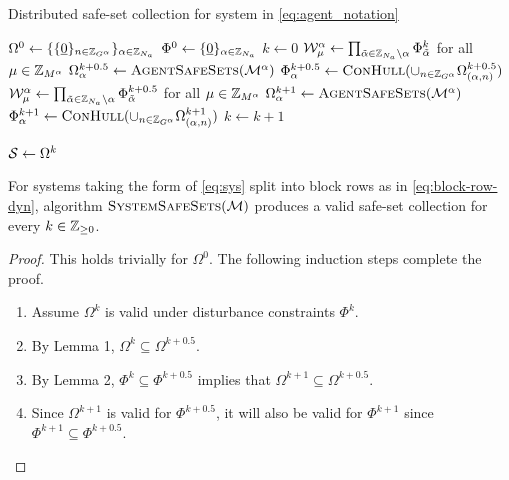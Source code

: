 \begin{algorithm}[t]
\caption{Distributed safe-set collection for system in \autoref{eq:agent_notation}}\label{alg:safe_sets}
\begin{algorithmic}[1]
\State $\Omega^0\gets\{\{\underline{0}\}_{n\in\idxset{\gnumnodes[\agentidx]}}\}_{\agentidx\in\idxset{\numagents}}$
\State $\Phi^0\gets\{\underline{0}\}_{\alpha\in\mathbb{Z}_{{N_a}}}$
\State $k\gets0$
\Repeat
		\State $\wcon[\modeidx]^\agentidx\gets\prod_{\tilde{\agentidx}\in\idxset{\numagents}\setminus \agentidx}\Phi^{k}_{\tilde\agentidx}$ for all $\modeidx\in\idxset{\nummodes[\agentidx]}$
		\State $\Omega^{k+0.5}_{\agentidx}\gets\Call{AgentSafeSets}{\modes[\agentidx]}$
		\State $\Phi^{k+0.5}_{\agentidx}\gets\Call{ConHull}{\cup_{n\in\idxset{\gnumnodes[{\agentidx}]}}\Omega^{k+0.5}_{({\agentidx},n)}}$
	\EndParFor
		\State $\wcon[\modeidx]^\agentidx\gets\prod_{\tilde{\agentidx}\in\idxset{\numagents}\setminus \agentidx}\Phi^{k+0.5}_{\tilde\agentidx}$ for all $\modeidx\in\idxset{\nummodes[\agentidx]}$
		\State $\Omega^{k+1}_{\agentidx}\gets\Call{AgentSafeSets}{\modes[\agentidx]}$
		\State $\Phi^{k+1}_{\agentidx}\gets\Call{ConHull}{\cup_{n\in\idxset{\gnumnodes[{\agentidx}]}}\Omega^{k+1}_{({\agentidx},n)}}$
	\EndParFor
	\State $k\gets k+1$

\State $\mathcal{S}\gets\Omega^k$
\EndProcedure
\end{algorithmic}
\end{algorithm}
\begin{lemma}
For systems taking the form of \autoref{eq:sys} split into block rows as in \autoref{eq:block-row-dyn}, algorithm $\Call{SystemSafeSets}{\agents}$ produces a valid safe-set collection for every $k\in\mathbb{Z}_{\geq 0}$. 
\end{lemma}
\begin{proof}
This holds trivially for $\Omega^0$. The following induction steps complete the proof.
\begin{enumerate}
	\item Assume $\Omega^k$ is valid under disturbance constraints $\Phi^k$.
	\item By Lemma 1, $\Omega^k\subseteq\Omega^{k+0.5}$.
	\item By Lemma 2, $\Phi^k\subseteq\Phi^{k+0.5}$ implies that $\Omega^{k+1}\subseteq\Omega^{k+0.5}$.
	\item Since $\Omega^{k+1}$ is valid for $\Phi^{k+0.5}$, it will also be valid for $\Phi^{k+1}$ since $\Phi^{k+1}\subseteq\Phi^{k+0.5}$.
\end{enumerate}
\end{proof}